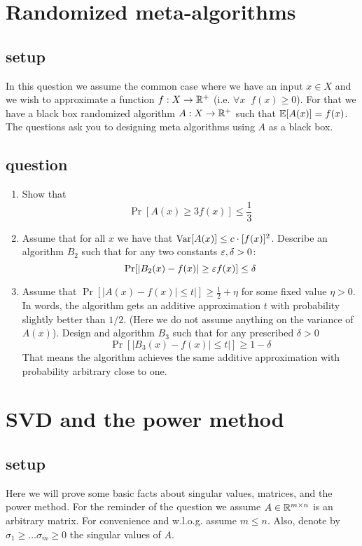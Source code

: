 \documentclass{article}
\begin{document}

\section{Randomized meta-algorithms}
\subsection*{setup}
In this question we assume the common case where we have an input $x \in X$  
and we wish to approximate a function $f:X \rightarrow {\mathbb{R}}^+$ (i.e. $\forall x\;\;f(x) \ge 0$).
For that we have a black box randomized algorithm $A:X\rightarrow {\mathbb{R}}^+$ such that ${\mathbb E}[A(x)] = f(x)$.
The questions ask you to designing meta algorithms using $A$ as a black box. 
\subsection*{question}
\begin{enumerate}
\item Show that
\[
\Pr[A(x) \ge 3f(x)] \le \frac{1}{3}
\]
\item Assume that for all $x$ we have that ${\operatorname{Var}}[A(x)] \le c\cdot [f(x)]^2$.
Describe an algorithm $B_2$ such that for any two constants $\varepsilon,\delta > 0$:
\[
\Pr[|B_2(x) - f(x)| \ge \varepsilon f(x)] \le \delta
\]
\item Assume that $\Pr[|A(x) - f(x) | \le t|] \ge \frac{1}{2}+\eta$ for some fixed value $\eta > 0$.
In words, the algorithm gets an additive approximation $t$ with probability slightly better than $1/2$.
(Here we do not assume anything on the variance of $A(x)$).
Design and algorithm $B_3$ such that for any prescribed $\delta >0$
\[
\Pr[|B_3(x) - f(x) | \le t|] \ge 1 - \delta
\]
That means the algorithm achieves the same additive approximation with probability arbitrary close to one.
\end{enumerate}

\pagebreak
\section{SVD and the power method}
\subsection*{setup}

Here we will prove some basic facts about singular values, matrices, and the power method.
For the reminder of the question we assume $A \in {\mathbb{R}}^{m \times n}$ is an arbitrary matrix.
For convenience and w.l.o.g. assume $m \le n$. Also, denote by $\sigma_1 \ge \ldots \sigma_m \ge 0$
the singular values of $A$.
\end{document}
